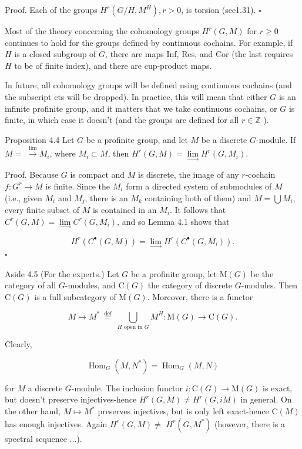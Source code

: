 \documentclass[10pt]{article}
\begin{document}
Proof. Each of the groups $H^{r}\left(G / H, M^{H}\right), r>0$, is torsion (see1.31). \(\square\)

Most of the theory concerning the cohomology groups $H^{r}(G, M)$ for $r \geq 0$ continues to hold for the groups defined by continuous cochains. For example, if $H$ is a closed subgroup of $G$, there are maps Inf, Res, and Cor (the last requires $H$ to be of finite index), and there are cup-product maps.

In future, all cohomology groups will be defined using continuous cochains (and the subscript cts will be dropped). In practice, this will mean that either $G$ is an infinite profinite group, and it matters that we take continuous cochains, or $G$ is finite, in which case it doesn't (and the groups are defined for all $r \in \mathbb{Z}$ ).

Proposition 4.4 Let $G$ be a profinite group, and let $M$ be a discrete $G$-module. If $M=$ $\xrightarrow{\lim } M_{i}$, where $M_{i} \subset M$, then $H^{r}(G, M)=\underset{\longrightarrow}{\lim } H^{r}\left(G, M_{i}\right)$.

Proof. Because $G$ is compact and $M$ is discrete, the image of any $r$-cochain $f: G^{r} \rightarrow M$ is finite. Since the $M_{i}$ form a directed system of submodules of $M$ (i.e., given $M_{i}$ and $M_{j}$, there is an $M_{k}$ containing both of them) and $M=\bigcup M_{i}$, every finite subset of $M$ is contained in an $M_{i}$. It follows that $C^{r}(G, M)=\underset{\longrightarrow}{\lim } C^{r}\left(G, M_{i}\right)$, and so Lemma 4.1 shows that

$$
H^{r}\left(C^{\bullet}(G, M)\right)=\underset{\longrightarrow}{\lim } H^{r}\left(C^{\bullet}\left(G, M_{i}\right)\right) .
$$ \(\square\)

Aside 4.5 (For the experts.) Let $G$ be a profinite group, let $\mathrm{M}(G)$ be the category of all $G$-modules, and $\mathrm{C}(G)$ the category of discrete $G$-modules. Then $\mathrm{C}(G)$ is a full subcategory of $\mathrm{M}(G)$. Moreover, there is a functor

$$
M \mapsto M^{*} \stackrel{\text { def }}{=} \bigcup_{H \text { open in } G} M^{H}: \mathrm{M}(G) \rightarrow \mathrm{C}(G) .
$$

Clearly,

$$
\operatorname{Hom}_{G}\left(M, N^{*}\right)=\operatorname{Hom}_{G}(M, N)
$$

for $M$ a discrete $G$-module. The inclusion functor $i: \mathrm{C}(G) \rightarrow \mathrm{M}(G)$ is exact, but doesn't preserve injectives-hence $H^{r}(G, M) \neq H^{r}(G, i M)$ in general. On the other hand, $M \mapsto M^{*}$ preserves injectives, but is only left exact-hence $\mathrm{C}(M)$ has enough injectives. Again $H^{r}(G, M) \neq$ $H^{r}\left(G, M^{*}\right)$ (however, there is a spectral sequence ...).
\end{document}
